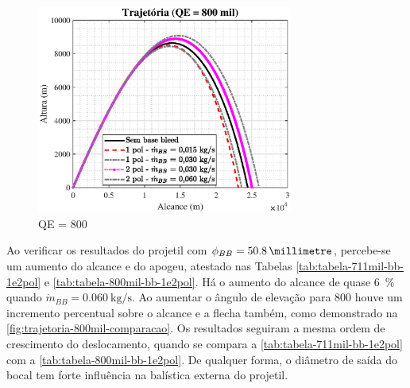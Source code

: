\begin{figure}[!htpb]
	\centering
    \includegraphics[width=0.75\textwidth]{foto2-qe800mil-comparacao.eps}
    \caption[QE = \qty{800}{\milliradian} \(\left(\phi_{BB} = \qty{25,4}{\millimetre}\right)\)]{QE = \qty{800}{\milliradian}}
    \label{fig:trajetoria-800mil-comparacao}
\end{figure}

Ao verificar os resultados do projetil com \(\phi_{BB} = \qty{50,8}{\millimetre}\), percebe-se um aumento do alcance e do apogeu, atestado nas Tabelas \ref{tab:tabela-711mil-bb-1e2pol} e \ref{tab:tabela-800mil-bb-1e2pol}. Há o aumento do alcance de quase \qty{6}{\percent} quando \(\Dot{m}_{BB} = \qty{0,060}{\kilogram\per\second}\). Ao aumentar o ângulo de elevação para \qty{800}{\milliradian} houve um incremento percentual sobre o alcance e a flecha também, como demonstrado na \autoref{fig:trajetoria-800mil-comparacao}. Os resultados seguiram a mesma ordem de crescimento do deslocamento, quando se compara a \autoref{tab:tabela-711mil-bb-1e2pol} com a \autoref{tab:tabela-800mil-bb-1e2pol}. De qualquer forma, o diâmetro de saída do bocal tem forte influência na balística externa do projetil.

